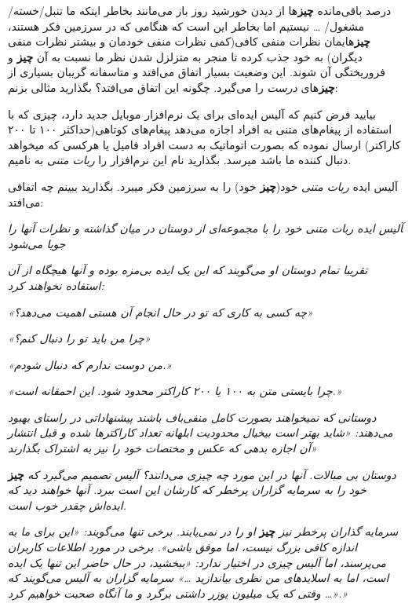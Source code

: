 درصد باقی‌مانده \textbf{چیز}ها از دیدن خورشید روز باز می‌مانند بخاطر
اینکه ما تنبل/خسته/مشغول/ \ldots{} نیستیم اما بخاطر این است که هنگامی که
در سرزمین فکر هستند، \textbf{چیز}هایمان نظرات منفی کافی(کمی نظرات منفی
خودمان و بیشتر نظرات منفی دیگران) به خود جذب کرده تا منجر به متزلزل شدن
نظر ما نسبت به آن \textbf{چیز} و فروریختگی آن شوند. این وضعیت بسیار
اتفاق می‌افتد و متاسفانه گریبان بسیاری از \textbf{چیز}های \emph{درست} را
می‌گیرد. چگونه این اتفاق می‌افتد؟ بگذارید مثالی بزنم:

بیایید فرض کنیم که آلیس ایده‌ای برای یک نرم‌افزار موبایل جدید دارد، چیزی
که با استفاده از پیغام‌های متنی به افراد اجازه می‌دهد پیغام‌های
کوتاهی(حداکثر ۱۰۰ تا ۲۰۰ کاراکتر) ارسال نموده که بصورت اتوماتیک به دست
افراد فامیل یا هرکسی که میخواهد دنبال کننده ما باشد میرسد. بگذارید نام
این نرم‌افزار را \emph{ربات متنی} به نامیم.

آلیس ایده \emph{ربات متنی} خود(\textbf{چیز} خود) را به سرزمین فکر‌
میبرد. بگذارید ببینم چه اتفاقی می‌افتد:

‍\emph{آلیس ایده ربات متنی خود را با مجموعه‌ای از دوستان در میان گذاشته
و نظرات آنها را جویا می‌شود}

\emph{تقریبا تمام دوستان او می‌گویند که این یک ایده بی‌مزه بوده و آنها
هیچگاه از آن استفاده نخواهند کرد:}

\emph{«چه کسی به کاری که تو در حال انجام آن هستی اهمیت می‌دهد؟»}

\emph{«چرا من باید تو را دنبال کنم؟»}

\emph{«من دوست ندارم که دنبال شودم.»}

\emph{«چرا بایستی متن به ۱۰۰ یا ۲۰۰ کاراکتر محدود شود. این احمقانه
است.»}

\emph{دوستانی که نمیخواهند بصورت کامل منفی‌باف باشند پیشنهاداتی در
راستای بهبود می‌دهند: «شاید بهتر است بیخیال محدودیت ابلهانه تعداد
کاراکترها شده و قبل انتشار آن اجازه بدهی که عکس و مختصات خود را نیز به
اشتراک بگذارند»}

\emph{دوستان بی مبالات. آنها در این مورد چه چیزی می‌دانند؟ آلیس تصمیم
می‌گیرد که} \textbf{چیز} \emph{خود را به سرمایه گزاران پرخطر که کارشان
این است ببرد. آنها خواهند دید که ایده‌اش چقدر خوب است.}

\emph{سرمایه گذاران پرخطر نیز} \textbf{چیز} \emph{او را در نمی‌یابند.
برخی تنها می‌گویند: «این برای ما به اندازه کافی بزرگ نیست، اما موفق
باشی». برخی در مورد اطلاعات کاربران می‌پرسند، اما آلیس چیزی در اختیار
ندارد: «ببخشید، در حال حاضر این تنها یک ایده‌ است، اما به اسلایدهای من
نظری بیاندازید \ldots{}» سرمایه گزاران به آلیس می‌گویند که «\ldots{}
وقتی که یک میلیون یوزر داشتی برگرد و ما آنگاه صحبت خواهیم کرد.»}

